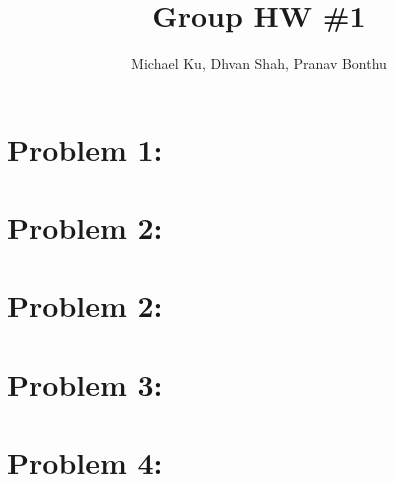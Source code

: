 \documentclass[11pt]{article}
\begin{document}
\title{Group HW \#1}
\author{Michael Ku, Dhvan Shah, Pranav Bonthu}
\maketitle

\section*{Problem 1:}


\section*{Problem 2:}


\section*{Problem 2:}


\section*{Problem 3:}


\section*{Problem 4:}

\end{document}
